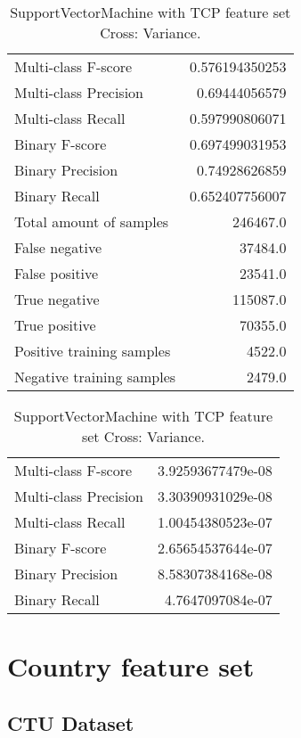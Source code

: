 \begin{table}[H]
\begin{minipage}{0.5\textwidth}
\caption{SupportVectorMachine with TCP feature set Cross: Average.}
\centering
\begin{tabular}{l r}
\toprule
Multi-class F-score & 0.576194350253 \\
Multi-class Precision & 0.69444056579 \\
Multi-class Recall & 0.597990806071 \\
\midrule
Binary F-score & 0.697499031953 \\
Binary Precision & 0.74928626859 \\
Binary Recall & 0.652407756007 \\
\midrule
Total amount of samples & 246467.0 \\
False negative & 37484.0 \\
False positive & 23541.0 \\
True negative & 115087.0 \\
True positive & 70355.0 \\
\midrule
Positive training samples & 4522.0 \\
Negative training samples & 2479.0 \\
\bottomrule
\end{tabular}
\end{minipage}
\hfillx
\begin{minipage}{0.5\textwidth}
\caption{SupportVectorMachine with TCP feature set Cross: Variance.}
\centering
\begin{tabular}{l r}
\toprule
Multi-class F-score & 3.92593677479e-08 \\
Multi-class Precision & 3.30390931029e-08 \\
Multi-class Recall & 1.00454380523e-07 \\
\midrule
Binary F-score & 2.65654537644e-07 \\
Binary Precision & 8.58307384168e-08 \\
Binary Recall & 4.7647097084e-07 \\
\bottomrule
\end{tabular}
\end{minipage}
\end{table}

\newpage
\section{Country feature set}
\subsection{CTU Dataset}

